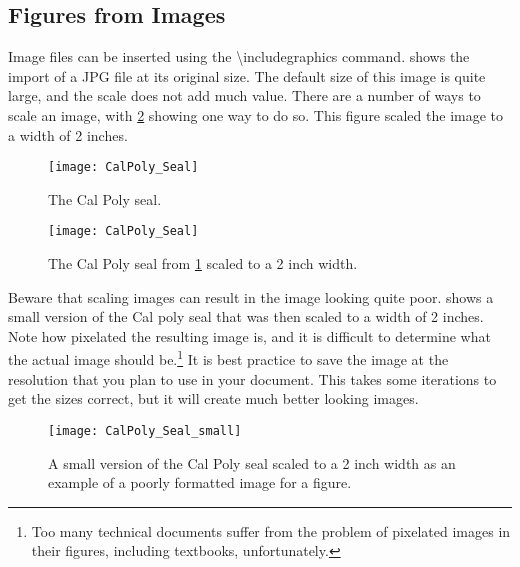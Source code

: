 \subsection{Figures from Images} \label{sec:FiguresFromImages}
    Image files can be inserted using the \textbackslash includegraphics command.
     shows the import of a JPG file at its original size.
    The default size of this image is quite large, and the scale does not add much value.
    There are a number of ways to scale an image, with \cref{fig:CalPolySeal_small} showing one way to do so.
    This figure scaled the image to a width of 2 inches.
    \begin{figure}
        \centering
        \texttt{[image: CalPoly\_Seal]}
        \caption{The Cal Poly seal.}
        \label{fig:CalPolySeal1}
    \end{figure}
    \begin{figure}
        \centering
        \texttt{[image: CalPoly\_Seal]}
        \caption{The Cal Poly seal from \cref{fig:CalPolySeal1} scaled to a 2 inch width.}
        \label{fig:CalPolySeal_small}
    \end{figure}

    Beware that scaling images can result in the image looking quite poor.
     shows a small version of the Cal poly seal that was then scaled to a width of 2 inches.
    Note how pixelated the resulting image is, and it is difficult to determine what the actual image should be.\footnote{Too many technical documents suffer from the problem of pixelated images in their figures, including textbooks, unfortunately.}
    It is best practice to save the image at the resolution that you plan to use in your document.
    This takes some iterations to get the sizes correct, but it will create much better looking images.
    \begin{figure}
        \centering
        \texttt{[image: CalPoly\_Seal\_small]}
        \caption{A small version of the Cal Poly seal scaled to a 2 inch width as an example of a poorly formatted image for a figure.}
        \label{fig:CalPolySeal_scaled}
    \end{figure}

